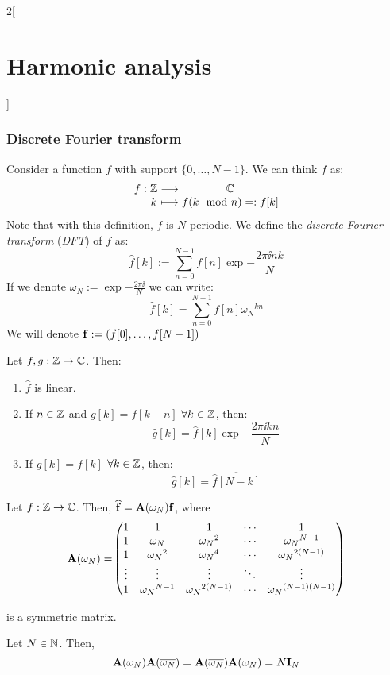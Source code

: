 \documentclass[../../../main_math.tex]{subfiles}
\begin{document}
\begin{multicols}{2}[\section{Harmonic analysis}]
  \subsubsection{Discrete Fourier transform}
  \begin{definition}
    Consider a function $f$ with support $\{0,\ldots,N-1\}$. We can think $f$ as:
    $$\function{f}{\ZZ}{\CC}{k}{f(k\mod{n})=:f[k]}$$
    Note that with this definition, $f$ is $N$-periodic. We define the \emph{discrete Fourier transform} (\emph{DFT}) of $f$ as:
    $$\widehat{f}[k]:=\sum_{n=0}^{N-1}f[n]\exp{-\frac{2\pi\ii nk}{N}}$$
    If we denote $\omega_N:=\exp{-\frac{2\pi\ii}{N}}$ we can write:
    $$\widehat{f}[k]=\sum_{n=0}^{N-1}f[n]{\omega_N}^{kn}$$
    We will denote $\boldsymbol{\mathrm{f}}:=(f[0],\ldots,f[N-1])$
  \end{definition}
  \begin{proposition}
    Let $f,g:\mathbb{Z}\rightarrow\mathbb{C}$. Then:
    \begin{enumerate}
      \item $\widehat{f}$ is linear.
      \item If $n\in\mathbb{Z}$ and $g[k]=f[k-n]$ $\forall k\in\mathbb{Z}$, then: $$\widehat{g}[k]=\widehat{f}[k]\exp{-\frac{2\pi\ii k n}{N}}$$
      \item If $g[k]=\overline{f[k]}$ $\forall k\in\mathbb{Z}$, then: $$\widehat{g}[k]=\overline{\widehat{f}[N-k]}$$
    \end{enumerate}
  \end{proposition}
  \begin{proposition}
    Let $f:\mathbb{Z}\rightarrow\mathbb{C}$. Then, $\boldsymbol{\mathrm{\widehat{f}}}=\boldsymbol{\mathrm{A}}(\omega_N)\boldsymbol{\mathrm{f}}$, where
    $$\boldsymbol{\mathrm{A}}(\omega_N)=\!\begin{pmatrix}
        1      & 1                & 1                   & \cdots & 1                       \\
        1      & \omega_N         & {\omega_N}^2        & \cdots & {\omega_N}^{N-1}        \\
        1      & {\omega_N}^2     & {\omega_N}^4        & \cdots & {\omega_N}^{2(N-1)}     \\
        \vdots & \vdots           & \vdots              & \ddots & \vdots                  \\
        1      & {\omega_N}^{N-1} & {\omega_N}^{2(N-1)} & \cdots & {\omega_N}^{(N-1)(N-1)}
      \end{pmatrix}$$
  \end{proposition}
  is a symmetric matrix.
  \begin{lemma}
    Let $N\in\mathbb{N}$. Then, $$\boldsymbol{\mathrm{A}}(\omega_N)\boldsymbol{\mathrm{A}}(\overline{\omega_N})=\boldsymbol{\mathrm{A}}(\overline{\omega_N})\boldsymbol{\mathrm{A}}(\omega_N)=N\boldsymbol{\mathrm{I}}_N$$

\end{lemma}
\end{multicols}
\end{document}
